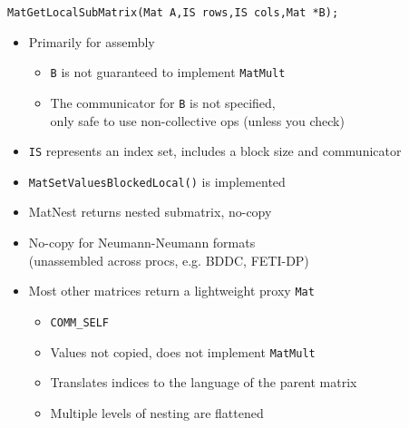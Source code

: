 \begin{frame}
  \alert{\texttt{MatGetLocalSubMatrix(Mat A,IS rows,IS cols,Mat *B);}}
  \begin{itemize}
  \item Primarily for assembly
    \begin{itemize}
    \item \texttt{B} is not guaranteed to implement \texttt{MatMult}
    \item The communicator for \texttt{B} is not specified, \\
      only safe to use non-collective ops (unless you check)
    \end{itemize}
  \item \texttt{IS} represents an index set, includes a block size and communicator
  \item \texttt{MatSetValuesBlockedLocal()} is implemented
  \item MatNest returns nested submatrix, no-copy
  \item No-copy for Neumann-Neumann formats \\ (unassembled across procs, e.g. BDDC, FETI-DP)
  \item Most other matrices return a lightweight proxy \texttt{Mat}
    \begin{itemize}
    \item \texttt{COMM\_SELF}
    \item Values not copied, does not implement \texttt{MatMult}
    \item Translates indices to the language of the parent matrix
    \item Multiple levels of nesting are flattened
    \end{itemize}
  \end{itemize}
\end{frame}
